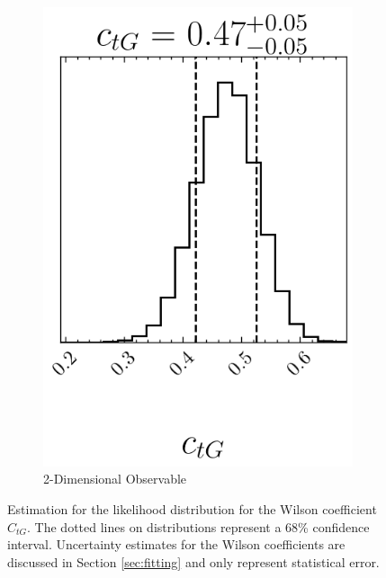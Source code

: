 \documentclass[a4paper,11pt]{article}
\begin{document}
\begin{figure}[htb]
\begin{subfigure}[b]{0.3\textwidth}
        \includegraphics[width=\textwidth]{plots/ATLAS-ctg_2D_1OP.png}
        \caption{2-Dimensional Observable}
    \end{subfigure}
    \caption{Estimation for the likelihood distribution for the Wilson coefficient $C_{tG}$. The dotted lines on distributions represent a 68\% confidence interval. Uncertainty estimates for the Wilson coefficients are discussed in Section \ref{sec:fitting} and only represent statistical error.}
    \label{fig:corner_1OP}
\end{figure}
\end{document}
